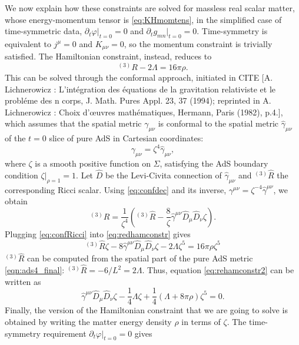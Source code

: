 \documentclass[a4paper,11pt]{article}
\numberwithin{equation}{section}
\begin{document}
We now explain how these constraints are solved for massless real scalar matter, whose energy-momentum tensor is \eqref{eq:KHmomtens}, in the simplified case of time-symmetric data, $\partial_t \varphi|_{t=0}=0$ and $\partial_t g_{mn}|_{t=0}=0$. Time-symmetry is equivalent to $j^\mu=0$ and $K_{\mu\nu}=0$, so the momentum constraint is trivially satisfied.
The Hamiltonian constraint, instead, reduces to
\begin{equation}
\label{eq:redhamconstr}
^{(3)}R-2\Lambda=16\pi\rho.
\end{equation}
This can be solved through the conformal approach, initiated in CITE [A. Lichnerowicz : L'int\'{e}gration des \'{e}quations de la gravitation relativiste et le probl\'{e}me des n corps, J. Math. Pures Appl. 23, 37 (1994); reprinted in A. Lichnerowicz : Choix d'{\oe}uvres math\'{e}matiques, Hermann, Paris (1982), p.4.], which assumes that the spatial metric $\gamma_{\mu\nu}$ is conformal to the spatial metric $\hat{\gamma}_{\mu\nu}$ of the $t=0$ slice of pure AdS in Cartesian coordinates:
\begin{equation}
\label{eq:confdec}
\gamma_{\mu\nu}=\zeta^4 \hat{\gamma}_{\mu\nu},
\end{equation}
where $\zeta$ is a smooth positive function on $\Sigma$, satisfying the AdS boundary condition $\zeta|_{\rho=1}=1$. Let $\hat{D}$ be the Levi-Civita connection of $\hat{\gamma}_{\mu\nu}$ and $^{(3)}\hat{R}$ the corresponding Ricci scalar. Using  \eqref{eq:confdec} and its inverse, $\gamma^{\mu\nu}=\zeta^{-4} \hat{\gamma}^{\mu\nu}$, we obtain
\begin{equation}
\label{eq:confRicci}
^{(3)}R=\frac{1}{\zeta^4}\left(^{(3)}\hat{R}-\frac{8}{\zeta}\hat{\gamma}^{\mu\nu}\hat{D}_\mu \hat{D}_\nu \zeta\right).
\end{equation}
Plugging \eqref{eq:confRicci} into \eqref{eq:redhamconstr} gives
\begin{equation}
\label{eq:rehamconstr2}
^{(3)}\hat{R}\zeta-8\hat{\gamma}^{\mu\nu}\hat{D}_\mu \hat{D}_\nu \zeta-2\Lambda \zeta^5=16\pi\rho \zeta^5
\end{equation}
$^{(3)}\hat{R}$ can be computed from the spatial part of the pure AdS metric \eqref{eqn:ads4_final}: $^{(3)}\hat{R}=-6/L^2=2\Lambda$. Thus, equation \eqref{eq:rehamconstr2} can be written as
\begin{equation}
\label{eq:rehamconstr3}
\hat{\gamma}^{\mu\nu}\hat{D}_\mu \hat{D}_\nu \zeta-\frac{1}{4}\Lambda\zeta+\frac{1}{4}(\Lambda+8\pi\rho)\zeta^5=0.
\end{equation}
Finally, the version of the Hamiltonian constraint that we are going to solve is obtained by writing the matter energy density $\rho$ in terms of $\zeta$. The time-symmetry requirement $\partial_t \varphi|_{t=0}=0$ gives
\end{document}
